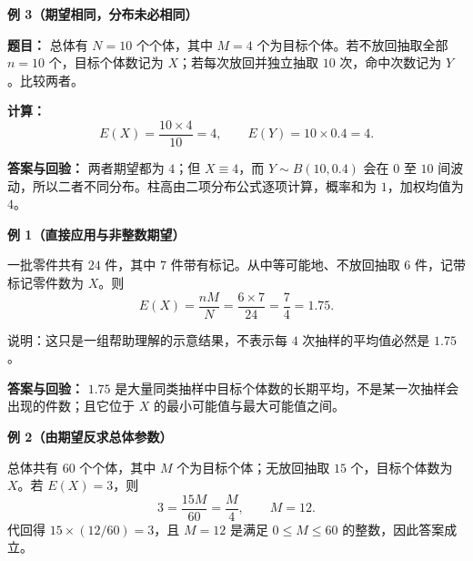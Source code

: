 \clearpage
\begin{examplebox}
	\textbf{\textcolor{CExample}{例 3（期望相同，分布未必相同）}}

	\textbf{\textcolor{CExample}{题目：}}
	总体有 $N=10$ 个个体，其中 $M=4$ 个为目标个体。若不放回抽取全部 $n=10$ 个，目标个体数记为 $X$；若每次放回并独立抽取 $10$ 次，命中次数记为 $Y$。比较两者。

	\textbf{\textcolor{CExample}{计算：}}
	\[
		E(X)=\frac{10\times4}{10}=4,
		\qquad
		E(Y)=10\times0.4=4.
	\]

	

	\textbf{\textcolor{CExample}{答案与回验：}}
	两者期望都为 $4$；但 $X\equiv4$，而 $Y\sim B(10,0.4)$ 会在 $0$ 至 $10$ 间波动，所以二者不同分布。柱高由二项分布公式逐项计算，概率和为 $1$，加权均值为 $4$。
\end{examplebox}

\clearpage
\begin{examplebox}
	\textbf{\textcolor{CExample}{例 1（直接应用与非整数期望）}}

	一批零件共有 $24$ 件，其中 $7$ 件带有标记。从中等可能地、不放回抽取 $6$ 件，记带标记零件数为 $X$。则
	\[
		E(X)=\frac{nM}{N}=\frac{6\times7}{24}=\frac{7}{4}=1.75.
	\]

	

	\textcolor{black!65}{说明：这只是一组帮助理解的示意结果，不表示每 $4$ 次抽样的平均值必然是 $1.75$。}

	\textbf{\textcolor{CExample}{答案与回验：}}
	$1.75$ 是大量同类抽样中目标个体数的长期平均，不是某一次抽样会出现的件数；且它位于 $X$ 的最小可能值与最大可能值之间。
\end{examplebox}

\medskip
\begin{examplebox}
	\textbf{\textcolor{CExample}{例 2（由期望反求总体参数）}}

	总体共有 $60$ 个个体，其中 $M$ 个为目标个体；无放回抽取 $15$ 个，目标个体数为 $X$。若 $E(X)=3$，则
	\[
		3=\frac{15M}{60}=\frac{M}{4},
		\qquad M=12.
	\]
	代回得 $15\times(12/60)=3$，且 $M=12$ 是满足 $0\le M\le60$ 的整数，因此答案成立。
\end{examplebox}
